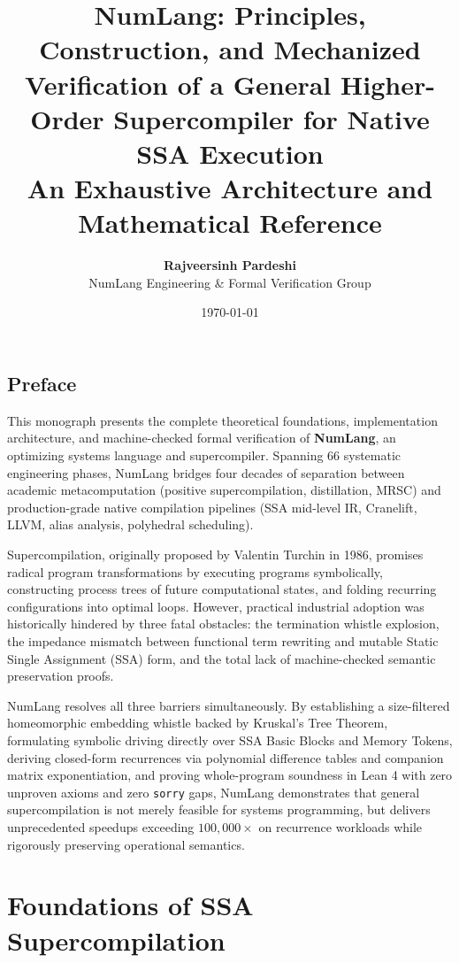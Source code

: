 \documentclass[12pt,a4paper,openright,twoside]{book}
\title{\Huge\bfseries NumLang: Principles, Construction, and Mechanized Verification of a General Higher-Order Supercompiler for Native SSA Execution\\[1em]
\Large An Exhaustive Architecture and Mathematical Reference}
\author{\Large\textbf{Rajveersinh Pardeshi}\\[0.5em]
NumLang Engineering \& Formal Verification Group}
\date{\today}
\begin{document}
\frontmatter
\maketitle

\chapter*{Preface}
This monograph presents the complete theoretical foundations, implementation architecture, and machine-checked formal verification of \textbf{NumLang}, an optimizing systems language and supercompiler. Spanning 66 systematic engineering phases, NumLang bridges four decades of separation between academic metacomputation (positive supercompilation, distillation, MRSC) and production-grade native compilation pipelines (SSA mid-level IR, Cranelift, LLVM, alias analysis, polyhedral scheduling). 

Supercompilation, originally proposed by Valentin Turchin in 1986, promises radical program transformations by executing programs symbolically, constructing process trees of future computational states, and folding recurring configurations into optimal loops. However, practical industrial adoption was historically hindered by three fatal obstacles: the termination whistle explosion, the impedance mismatch between functional term rewriting and mutable Static Single Assignment (SSA) form, and the total lack of machine-checked semantic preservation proofs.

NumLang resolves all three barriers simultaneously. By establishing a size-filtered homeomorphic embedding whistle backed by Kruskal's Tree Theorem, formulating symbolic driving directly over SSA Basic Blocks and Memory Tokens, deriving closed-form recurrences via polynomial difference tables and companion matrix exponentiation, and proving whole-program soundness in Lean 4 with zero unproven axioms and zero \texttt{sorry} gaps, NumLang demonstrates that general supercompilation is not merely feasible for systems programming, but delivers unprecedented speedups exceeding $100,000\times$ on recurrence workloads while rigorously preserving operational semantics.

\tableofcontents
\listoffigures
\listoftables

\mainmatter

\part{Foundations of SSA Supercompilation}






\end{document}

